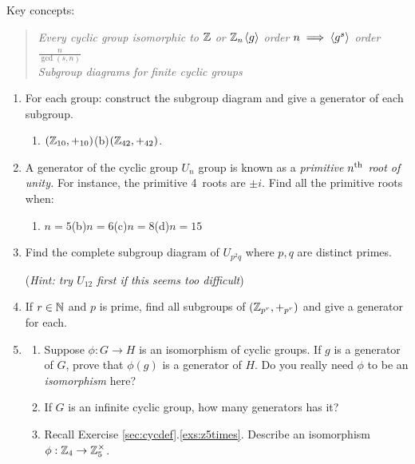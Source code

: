 \begin{exercises}
Key concepts:
\begin{quote}
	\emph{Every cyclic group isomorphic to $\mathbb{Z}$ or $\mathbb{Z}_n$\qquad $\left\langle g\right\rangle$ order $n\implies \left\langle g^s\right\rangle$ order $\frac n{\gcd(s,n)}$}\\
	\emph{Subgroup diagrams for finite cyclic groups}
\end{quote}

\begin{enumerate}
  
	\item For each group: construct the subgroup diagram and give a generator of each subgroup.
	\begin{enumerate}
	  \item $(\mathbb{Z}_{10},+_{10})$\qquad\qquad (b)\lstsp $(\mathbb{Z}_{42},+_{42})$.
	\end{enumerate}
  
  \item A generator of the cyclic group $U_n$ group is known as a \emph{primitive $n\textsuperscript{th}$ root of unity.} For instance, the primitive 4\th\ roots are $\pm i$. Find all the primitive roots when:
  \begin{enumerate}
    \item $n=5$\hfill (b)\lstsp $n=6$\hfill (c)\lstsp $n=8$\hfill (d)\lstsp $n=15$\hspace*{\fill}\hspace*{\fill}
  \end{enumerate}
	
	\item Find the complete subgroup diagram of $U_{p^2q}$ where $p,q$ are distinct primes.\par
	(\emph{Hint: try $U_{12}$ first if this seems too difficult})
  
  \item If $r\in\mathbb{N}$ and $p$ is prime, find all subgroups of $(\mathbb{Z}_{p^r},+_{p^r})$ and give a generator for each.
	
  \item\begin{enumerate}
    \item Suppose $\phi:G\to H$ is an isomorphism of cyclic groups. If $g$ is a generator of $G$, prove that $\phi(g)$ is a generator of $H$. Do you really need $\phi$ to be an \emph{isomorphism} here?
  
  	\item If $G$ is an infinite cyclic group, how many generators has it?
  	
		\item Recall Exercise \ref*{sec:cycdef}.\ref{exs:z5times}. Describe an isomorphism $\phi:\mathbb{Z}_4\to\mathbb{Z}_5^\times$.
  \end{enumerate} 
  

\end{enumerate}
\end{exercises}
